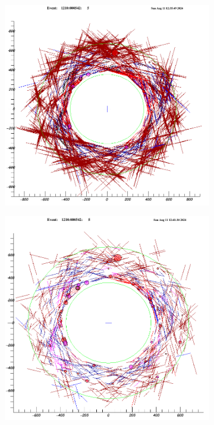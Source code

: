 \begin{figure}[!h]
    \begin{subfigure}[b]{0.4\linewidth}
        \centering
        \includegraphics[scale = 0.3]{figures/png/Screenshot_20240811_123612.png}
        \label{fig:bef}
    \end{subfigure}
    \begin{subfigure}[b]{0.7\linewidth}
        \centering
        \includegraphics[scale = 0.3]{figures/png/Screenshot_20240811_124245.png}

\end{subfigure}
\end{figure}
